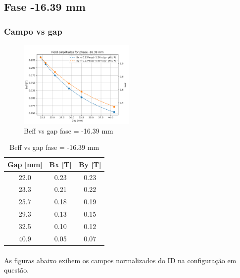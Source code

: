 \documentclass[a4paper,12pt]{article}
\begin{document}
\subsection{Fase -16.39 mm}



\subsubsection{Campo vs gap}
\begin{figure}[H]
\hspace{4cm}
\includegraphics[width=0.5\textwidth]{figs/phase-16 B vs gap.png}
\caption{Beff vs gap fase = -16.39 mm}
\label{fig:fieldgap-16}
\end{figure}

\begin{table}[H]
\caption{Beff vs gap fase = -16.39 mm}
\centering
\begin{tabular}{|c|c|c|}
\hline
   Gap [mm] &   Bx [T] &   By [T] \\
\hline
       22.0   &     0.23 &     0.23 \\
       23.3 &     0.21 &     0.22 \\
       25.7 &     0.18 &     0.19 \\
       29.3 &     0.13 &     0.15 \\
       32.5 &    0.10 &    0.12 \\
       40.9 &     0.05 &     0.07 \\
\hline
\end{tabular}
\end{table}

\paragraph{} As figuras abaixo exibem os campos normalizados do ID na configuração em questão.
\end{document}
